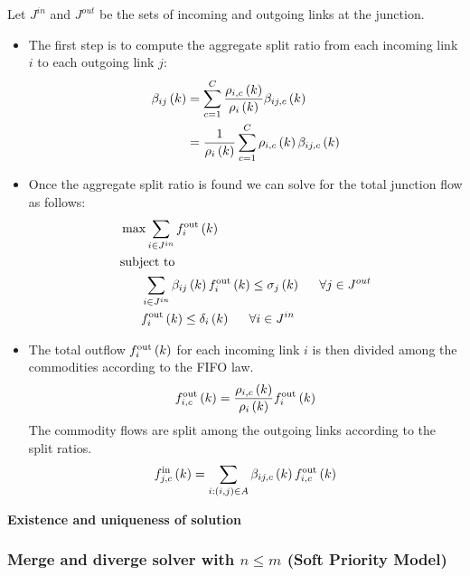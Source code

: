 Let $J^{in}$ and $J^{out}$ be the sets of incoming and outgoing links at the junction.

\begin{itemize}
\item The first step is to compute the aggregate split ratio from each incoming link $i$ to each outgoing link $j$:
	\begin{align*}
	\aggsplitratio{i}{j}{k} &= \sum_{c=1}^C \frac{\densitymc{i}{k}{c}}{\density{i}{k}}\splitratio{i}{j}{k}{c}\\
							&=  \frac{1}{\density{i}{k}} \sum_{c=1}^C \densitymc{i}{k}{c}\splitratio{i}{j}{k}{c}
	\end{align*} 

\item Once the aggregate split ratio is found we can solve for the total junction flow as follows:
	\begin{align*}
	&\max \sum_{i \in J^{in}}\flowout{i}{k} \\
	&\text{subject to} \\
	&\ \ \ \ \ \sum_{i \in J^{in}}\aggsplitratio{i}{j}{k} \flowout{i}{k} \le{\cellsupply{j}{k}} \ \ \ \ \ \forall{j\in J^{out}}\\
	&\ \ \ \ \ \flowout{i}{k} \le{\celldemand{i}{k}} \ \ \ \ \ \forall{i\in J^{in}}
	\end{align*}

\item The total outflow $\flowout{i}{k}$ for each incoming link $i$ is then divided among the commodities according to the FIFO law.
	\begin{align*}
	\flowoutmc{i}{k}{c} &= \frac{\densitymc{i}{k}{c}}{\density{i}{k}}\flowout{i}{k}\\
	\end{align*} 
	The commodity flows are split among the outgoing links according to the split ratios.
	\begin{align*}
	\flowinmc{j}{k}{c} &= \sum_{i:(i,j)\in A} \splitratio{i}{j}{k}{c} \flowoutmc{i}{k}{c}\\
	\end{align*} 
\end{itemize}

\textbf{Existence and uniqueness of solution}

\subsubsection{Merge and diverge solver with $n \leq{m}$ (Soft Priority Model)} 

